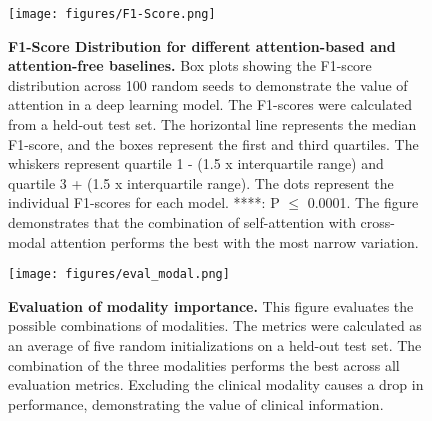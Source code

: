 \documentclass[11pt]{article}
\begin{document}
\begin{figure}[H]
\begin{center}
    \caption{\textbf{F1-Score Distribution for different attention-based and attention-free baselines.} Box plots showing the F1-score distribution across 100 random seeds to demonstrate the value of attention in a deep learning model. The F1-scores were calculated from a held-out test set. The horizontal line represents the median F1-score, and the boxes represent the first and third quartiles. The whiskers represent quartile 1 - (1.5 x interquartile range) and quartile 3 + (1.5 x interquartile range). The dots represent the individual F1-scores for each model. ****: P $\le$ 0.0001. The figure demonstrates that the combination of self-attention with cross-modal attention performs the best with the most narrow variation. }
    
  \texttt{[image: figures/F1-Score.png]}
  \label{fig:attention}
  \end{center}
\end{figure}

\begin{figure}[h!]
\begin{center}
  \caption{\textbf{Evaluation of modality importance.} This figure evaluates the possible combinations of modalities. The metrics were calculated as an average of five random initializations on a held-out test set. The combination of the three modalities performs the best across all evaluation metrics. Excluding the clinical modality causes a drop in performance, demonstrating the value of clinical information.}
  \label{fig:eval_metric}
  \texttt{[image: figures/eval\_modal.png]}
\end{center}
\end{figure}

\clearpage
\newpage
 
\end{document}
